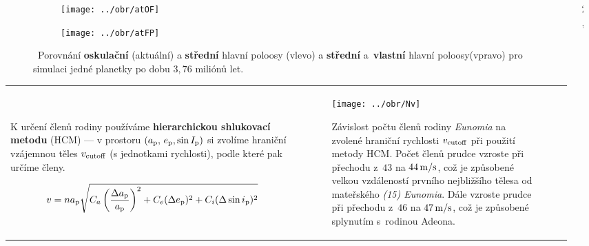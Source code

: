 \documentclass{beamer}
\newlength{\sep}
\newlength{\vyska}
\newlength{\vyskaA}
\newlength{\vyskaB}
\newlength{\side}
\newlength{\main}
\begin{document}
\begin{frame}
\begin{columns}[t]
\begin{column}{\side}
\begin{tcolorbox}[title=Metody\phantom{Úy},height=0.665\vyskaA]
		\begin{figure}
			\centering
			\begin{subfigure}[b]{0.49\textwidth}
			\centering
			\texttt{[image: ../obr/atOF]}
			\end{subfigure}
			\begin{subfigure}[b]{0.49\textwidth}
			\centering
			\texttt{[image: ../obr/atFP]}
			\end{subfigure}
			\caption{\ Porovnání \textbf{oskulační} (aktuální) a \textbf{střední} hlavní poloosy (vlevo) a \textbf{střední} a~\textbf{vlastní} hlavní poloosy(vpravo) pro simulaci jedné planetky po dobu $3,76$ miliónů let.}
		\end{figure}
		\vspace{-48pt}
		\begin{tabularx}{\textwidth}{p{12cm}X}

		\

		K určení členů rodiny používáme \textbf{hierarchickou shlukovací metodu} (HCM) --- v prostoru $(a_{\rm p},\,e_{\rm p},\sin I_{\rm p})$ si zvolíme hraniční vzájemnou \uv{vzdálenost} těles $v_{\rm cutoff}$ (s jednotkami rychlosti), podle které pak určíme členy.

		{\footnotesize \begin{align*}
			v=na_{\rm p}\sqrt{C_a\left(\frac{\Delta a_{\rm p}}{a_{\rm p}}\right)^2+C_e(\Delta e_{\rm p})^2+C_i(\Delta \sin i_{\rm p})^2}
		\end{align*}}
		&
		\begin{figure}
			\centering
			\texttt{[image: ../obr/Nv]}
			\caption{Závislost počtu členů rodiny \textit{Eunomia} na zvolené hraniční rychlosti $v_{\rm cutoff}$ při použití metody HCM. Počet členů prudce vzroste při přechodu z~$43$ na $44\,{\rm m/s}$, což je způsobené velkou vzdáleností prvního nejbližšího tělesa od mateřského \textit{(15) Eunomia}. Dále vzroste prudce při přechodu z~$46$ na $47\,{\rm m/s}$, což je způsobené splynutím s~rodinou Adeona.}
		\end{figure}
		\end{tabularx}

	\end{tcolorbox}

\vspace{\sep}

\end{column}

\begin{column}{2\sep}
\end{column}

\begin{column}{\main}
\begin{tcolorbox}[title=Výsledky\phantom{Úy},height=\vyskaB]


\end{tcolorbox}
\end{column}
\end{columns}
\end{frame}
\end{document}
